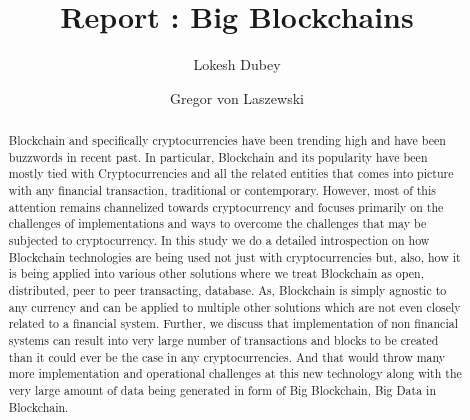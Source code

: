 
\title{Report : Big Blockchains}


\author{Lokesh Dubey}

\renewcommand{\shortauthors}{L. Dubey}

\author{Gregor von Laszewski}


\renewcommand{\shortauthors}{G. v. Laszewski}


\begin{abstract}

Blockchain and specifically cryptocurrencies have been trending high and have been buzzwords in recent past. In particular, Blockchain and its popularity have been mostly tied with Cryptocurrencies and all the related entities that comes into picture with any financial transaction, traditional or contemporary. However, most of this attention remains channelized towards cryptocurrency and focuses primarily on the challenges of implementations and ways to overcome the challenges that may be subjected to cryptocurrency. In this study we do a detailed introspection on how Blockchain technologies are being used not just with  cryptocurrencies but, also, how it is being applied into various other solutions where we treat Blockchain as open, distributed, peer to peer transacting, database. As, Blockchain is simply agnostic to any currency and can be applied to multiple other solutions which are not even closely related to a financial system. Further, we discuss that implementation of non financial systems can result into very large number of transactions and blocks to be created than it could ever be the case in any cryptocurrencies. And that would throw many more implementation and operational challenges at this new technology along with the very large amount of data being generated in form of Big Blockchain, Big Data in Blockchain.

\end{abstract}


